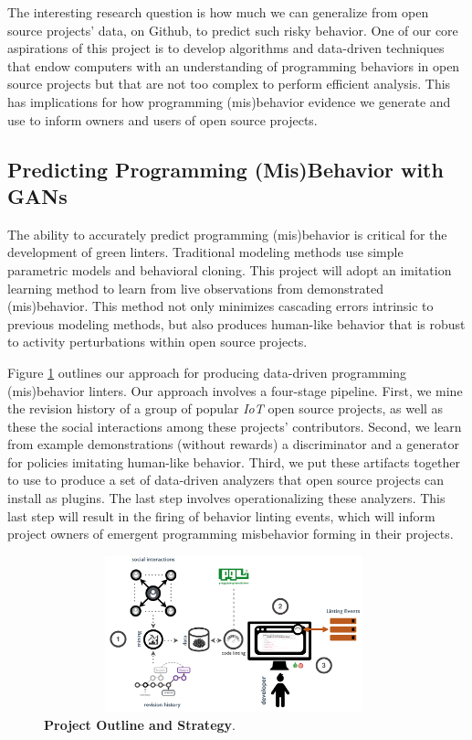 The interesting research question is how much we can generalize from open source
projects' data, on Github, to predict such risky behavior. One of our core
aspirations of this project is to develop algorithms and data-driven techniques
that endow computers with an understanding of programming behaviors in open
source projects but that are not too complex to perform efficient analysis. This
has implications for how programming (mis)behavior evidence we generate and use
to inform owners and users of open source projects.

\subsection{Predicting Programming (Mis)Behavior with GANs}
\label{subsec:fundamentals}

The ability to accurately predict programming (mis)behavior is critical for the
development of green linters. Traditional modeling methods use simple parametric
models and behavioral cloning. This project will adopt an imitation learning
method to learn from live observations from demonstrated (mis)behavior. This
method not only minimizes cascading errors intrinsic to previous modeling
methods, but also produces human-like behavior that is robust to activity
perturbations within open source projects.

Figure \ref{fig:outline} outlines our approach for producing data-driven
programming (mis)behavior linters. Our approach involves a four-stage pipeline.
First, we mine the revision history of a group of popular \textit{IoT} open
source projects, as well as these the social interactions among these projects'
contributors. Second, we learn from example demonstrations (without rewards)  a
discriminator and a generator for policies imitating human-like behavior. Third,
we put these artifacts together to use to produce a set of data-driven analyzers
that open source projects can install as plugins.  The last step involves
operationalizing these analyzers. This last step will result in the firing of
behavior linting events, which will inform project owners of emergent
programming misbehavior forming in their projects.

\begin{figure}[ht!]
\centering
\includegraphics[width=11cm,height=4.5cm,keepaspectratio]
{images/greenlintersworkflow.png}
\caption{{\bfseries Project Outline and Strategy}.}
\label{fig:outline}
\end{figure}
